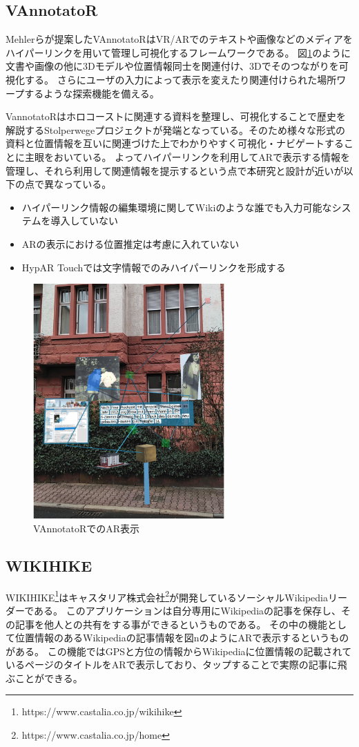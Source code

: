 \subsection{VAnnotatoR}
Mehlerらが提案したVAnnotatoR\cite{10.1145/3209542.3209572}はVR/ARでのテキストや画像などのメディアをハイパーリンクを用いて管理し可視化するフレームワークである。
図\ref{fig:VAnnotatoR}のように文書や画像の他に3Dモデルや位置情報同士を関連付け、3Dでそのつながりを可視化する。
さらにユーザの入力によって表示を変えたり関連付けられた場所ワープするような探索機能を備える。

VannotatoRはホロコーストに関連する資料を整理し、可視化することで歴史を解説するStolperwegeプロジェクトが発端となっている。そのため様々な形式の資料と位置情報を互いに関連づけた上でわかりやすく可視化・ナビゲートすることに主眼をおいている。
よってハイパーリンクを利用してARで表示する情報を管理し、それら利用して関連情報を提示するという点で本研究と設計が近いが以下の点で異なっている。
\begin{itemize} 
  \item ハイパーリンク情報の編集環境に関してWikiのような誰でも入力可能なシステムを導入していない
  \item ARの表示における位置推定は考慮に入れていない
  \item HypAR Touchでは文字情報でのみハイパーリンクを形成する
\end{itemize}

\begin{figure}[h]
  \centering 
  \includegraphics[height=90mm]{images/VAnnotatoR.png}
  \caption{VAnnotatoRでのAR表示} \label{fig:VAnnotatoR}
\end{figure}


\subsection{WIKIHIKE}
WIKIHIKE\footnote{\textsf{https://www.castalia.co.jp/wikihike}}はキャスタリア株式会社\footnote{\textsf{https://www.castalia.co.jp/home}}が開発しているソーシャルWikipediaリーダーである。
このアプリケーションは自分専用にWikipediaの記事を保存し、その記事を他人との共有をする事ができるというものである。
その中の機能として位置情報のあるWikipediaの記事情報を図nのようにARで表示するというものがある。
この機能ではGPSと方位の情報からWikipediaに位置情報の記載されているページのタイトルをARで表示しており、タップすることで実際の記事に飛ぶことができる。

